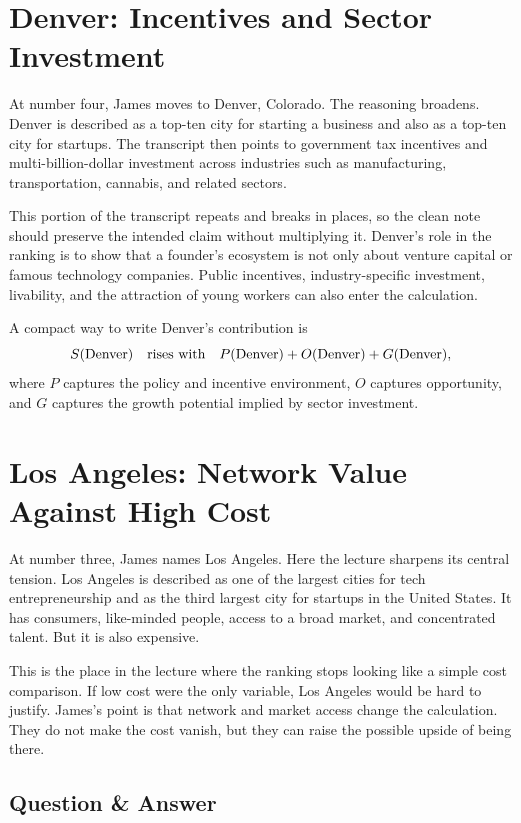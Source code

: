 \section{Denver: Incentives and Sector Investment}

At number four, James moves to Denver, Colorado. The reasoning broadens. Denver is described as a top-ten city for starting a business and also as a top-ten city for startups. The transcript then points to government tax incentives and multi-billion-dollar investment across industries such as manufacturing, transportation, cannabis, and related sectors.

This portion of the transcript repeats and breaks in places, so the clean note should preserve the intended claim without multiplying it. Denver's role in the ranking is to show that a founder's ecosystem is not only about venture capital or famous technology companies. Public incentives, industry-specific investment, livability, and the attraction of young workers can also enter the calculation.

A compact way to write Denver's contribution is
\begin{equation}
S(\text{Denver})
\quad \hbox{rises with} \quad
P(\text{Denver})+O(\text{Denver})+G(\text{Denver}),
\end{equation}
where \(P\) captures the policy and incentive environment, \(O\) captures opportunity, and \(G\) captures the growth potential implied by sector investment.

\section{Los Angeles: Network Value Against High Cost}

At number three, James names Los Angeles. Here the lecture sharpens its central tension. Los Angeles is described as one of the largest cities for tech entrepreneurship and as the third largest city for startups in the United States. It has consumers, like-minded people, access to a broad market, and concentrated talent. But it is also expensive.

This is the place in the lecture where the ranking stops looking like a simple cost comparison. If low cost were the only variable, Los Angeles would be hard to justify. James's point is that network and market access change the calculation. They do not make the cost vanish, but they can raise the possible upside of being there.

\subsection{Question \& Answer}

